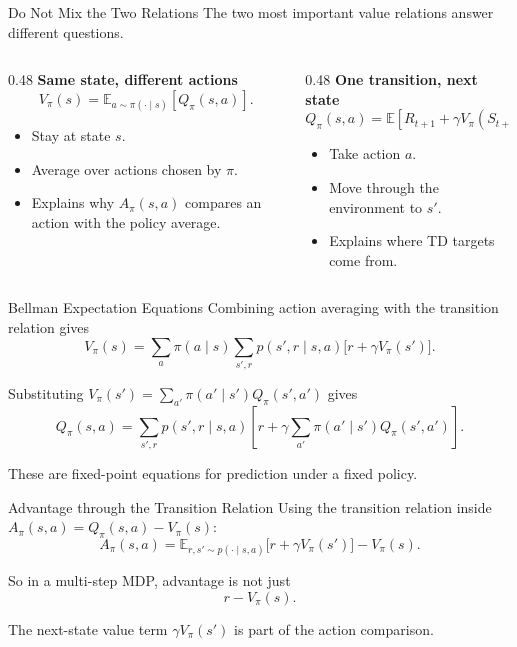 \documentclass[aspectratio=169]{beamer}
\newcommand{\EE}{\mathbb{E}}
\begin{document}
\begin{frame}{Do Not Mix the Two Relations}
\small
The two most important value relations answer different questions.

\vspace{0.5em}
\begin{columns}[T,onlytextwidth]
\begin{column}{0.48\textwidth}
\textbf{Same state, different actions}
\[
V_\pi(s)=\EE_{a\sim\pi(\cdot\mid s)}[Q_\pi(s,a)].
\]
\begin{itemize}
    \item Stay at state $s$.
    \item Average over actions chosen by $\pi$.
    \item Explains why $A_\pi(s,a)$ compares an action with the policy average.
\end{itemize}
\end{column}
\begin{column}{0.48\textwidth}
\textbf{One transition, next state}
\[
Q_\pi(s,a)=
\EE[R_{t+1}+\gamma V_\pi(S_{t+1})\mid S_t=s,A_t=a].
\]
\begin{itemize}
    \item Take action $a$.
    \item Move through the environment to $s'$.
    \item Explains where TD targets come from.
\end{itemize}
\end{column}
\end{columns}
\end{frame}

\begin{frame}{Bellman Expectation Equations}
\small
Combining action averaging with the transition relation gives
\[
V_\pi(s)=
\sum_a\pi(a\mid s)\sum_{s',r}p(s',r\mid s,a)
\bigl[r+\gamma V_\pi(s')\bigr].
\]

\vspace{0.4em}
Substituting $V_\pi(s')=\sum_{a'}\pi(a'\mid s')Q_\pi(s',a')$ gives
\[
Q_\pi(s,a)=
\sum_{s',r}p(s',r\mid s,a)
\left[
r+\gamma\sum_{a'}\pi(a'\mid s')Q_\pi(s',a')
\right].
\]

\vspace{0.4em}
These are fixed-point equations for prediction under a fixed policy.
\end{frame}

\begin{frame}{Advantage through the Transition Relation}
\small
Using the transition relation inside $A_\pi(s,a)=Q_\pi(s,a)-V_\pi(s)$:
\[
A_\pi(s,a)
=\EE_{r,s'\sim p(\cdot\mid s,a)}
\bigl[r+\gamma V_\pi(s')\bigr]
-V_\pi(s).
\]

\vspace{0.5em}
So in a multi-step MDP, advantage is not just
\[
r-V_\pi(s).
\]

\vspace{0.4em}
The next-state value term $\gamma V_\pi(s')$ is part of the action comparison.
\end{frame}
\end{document}
